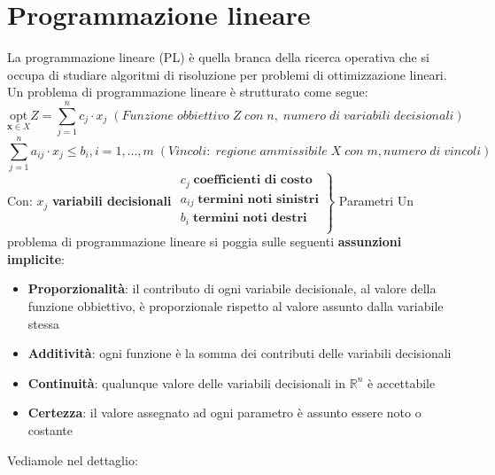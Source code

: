 \documentclass[12pt]{article}
\begin{document}
\section{Programmazione lineare}
La programmazione lineare (PL) è quella branca della ricerca operativa che si occupa di studiare algoritmi di risoluzione per problemi di ottimizzazione lineari.
Un problema di programmazione lineare è strutturato come segue:
$$\underset{\textbf{x} \in X}{\textrm{opt}}Z = \sum_{j=1}^{n} c_j \cdot x_j \; (Funzione \; obbiettivo \; Z \; con \; n, \; numero \; di \; variabili \; decisionali)$$
$$\sum_{j=1}^n a_{ij} \cdot x_j \leq b_i, i = 1,...,m \; (Vincoli: \; regione \; ammissibile \; X \; con \; m, numero \; di \; vincoli)$$
Con: \newline
$x_j$ \textbf{variabili decisionali} \newline
$\left. \begin{matrix}
        c_j \; \textbf{coefficienti di costo} \\
        a_{ij}\; \textbf{termini noti sinistri} \\
        b_i \; \textbf{termini noti destri} \\
\end{matrix}\right\}$ Parametri \newline
Un problema di programmazione lineare si poggia sulle seguenti \textbf{assunzioni implicite}:
\begin{itemize}
    \item \textbf{Proporzionalità}: il contributo di ogni variabile decisionale, al valore della funzione obbiettivo, è proporzionale rispetto al valore assunto dalla variabile stessa
    \item \textbf{Additività}: ogni funzione è la somma dei contributi delle variabili decisionali
    \item \textbf{Continuità}: qualunque valore delle variabili decisionali in $\mathbb{R}^n$ è accettabile
    \item \textbf{Certezza}: il valore assegnato ad ogni parametro è assunto essere noto o costante 
\end{itemize}
Vediamole nel dettaglio:
\end{document}
